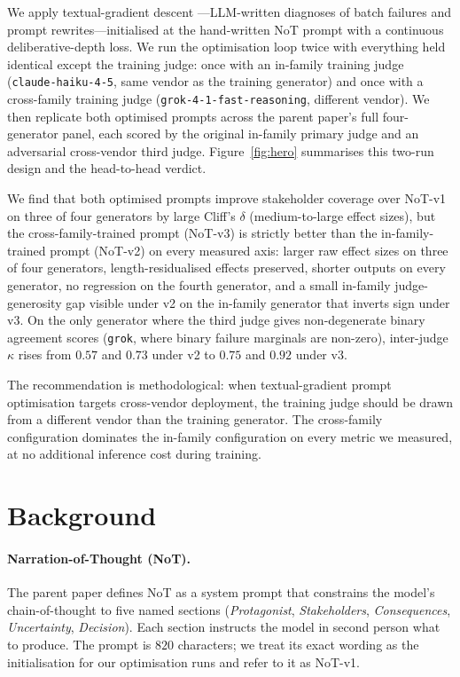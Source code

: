 \documentclass[11pt]{article}
\begin{document}
We apply textual-gradient descent \citep{yuksekgonul2024textgrad}---LLM-written diagnoses of batch failures and prompt rewrites---initialised at the hand-written NoT prompt with a continuous deliberative-depth loss.
We run the optimisation loop twice with everything held identical except the training judge: once with an in-family training judge (\texttt{claude-haiku-4-5}, same vendor as the training generator) and once with a cross-family training judge (\texttt{grok-4-1-fast-reasoning}, different vendor).
We then replicate both optimised prompts across the parent paper's full four-generator panel, each scored by the original in-family primary judge and an adversarial cross-vendor third judge.
Figure~\ref{fig:hero} summarises this two-run design and the head-to-head verdict.

We find that both optimised prompts improve stakeholder coverage over NoT-v1 on three of four generators by large Cliff's $\delta$ (medium-to-large effect sizes), but the cross-family-trained prompt (NoT-v3) is strictly better than the in-family-trained prompt (NoT-v2) on every measured axis: larger raw effect sizes on three of four generators, length-residualised effects preserved, shorter outputs on every generator, no regression on the fourth generator, and a small in-family judge-generosity gap visible under v2 on the in-family generator that inverts sign under v3.
On the only generator where the third judge gives non-degenerate binary agreement scores (\texttt{grok}, where binary failure marginals are non-zero), inter-judge $\kappa$ rises from $0.57$ and $0.73$ under v2 to $0.75$ and $0.92$ under v3.

The recommendation is methodological: when textual-gradient prompt optimisation targets cross-vendor deployment, the training judge should be drawn from a different vendor than the training generator.
The cross-family configuration dominates the in-family configuration on every metric we measured, at no additional inference cost during training.

\section{Background}
\label{sec:background}

\paragraph{Narration-of-Thought (NoT).}
The parent paper \citep{anon24parent} defines NoT as a system prompt that constrains the model's chain-of-thought to five named sections (\emph{Protagonist}, \emph{Stakeholders}, \emph{Consequences}, \emph{Uncertainty}, \emph{Decision}).
Each section instructs the model in second person what to produce.
The prompt is $820$ characters; we treat its exact wording as the initialisation for our optimisation runs and refer to it as NoT-v1.
\end{document}
